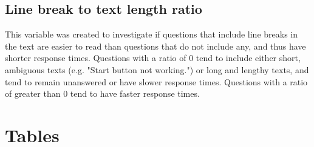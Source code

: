 \documentclass[]{interact}\usepackage[]{graphicx}\usepackage[]{color}
\begin{document}
\subsection{Line break to text length ratio}

This variable was created to investigate if questions that include line breaks in the text are easier to read than questions that do not include any, and thus have shorter response times. Questions with a ratio of 0 tend to include either short, ambiguous texts (e.g. "Start button not working.") or long and lengthy texts, and tend to remain unanswered or have slower response times. Questions with a ratio of greater than 0 tend to have faster response times. 


\section{Tables}
\end{document}
